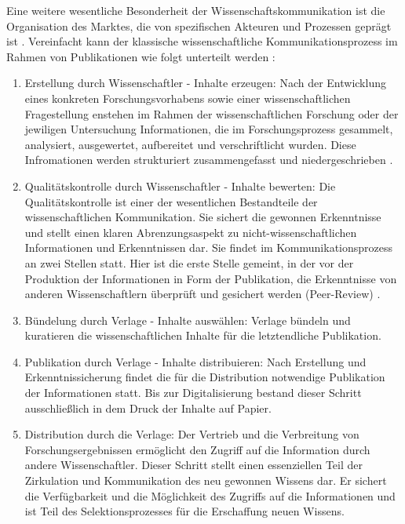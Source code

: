 Eine weitere wesentliche Besonderheit der Wissenschaftskommunikation ist die Organisation des Marktes, die von spezifischen Akteuren und Prozessen geprägt ist \cite{Hess_2006}. Vereinfacht kann der klassische wissenschaftliche Kommunikationsprozess im Rahmen von Publikationen wie folgt unterteilt werden\cite{cite:11b} \cite{Hess_2006}:
\begin{enumerate}
\item Erstellung durch Wissenschaftler - Inhalte erzeugen: 
Nach der Entwicklung eines konkreten Forschungsvorhabens sowie einer wissenschaftlichen Fragestellung enstehen im Rahmen der wissenschaftlichen Forschung oder der jewiligen Untersuchung Informationen\cite{cite:11c}, die im Forschungsprozess gesammelt, analysiert, ausgewertet, aufbereitet und verschriftlicht wurden\cite{cite:11d}. Diese Infromationen werden strukturiert zusammengefasst und niedergeschrieben \cite{Hess_2006}.
\item Qualitätskontrolle durch Wissenschaftler - Inhalte bewerten: 
Die Qualitätskontrolle ist einer der wesentlichen Bestandteile der wissenschaftlichen Kommunikation. Sie sichert die gewonnen Erkenntnisse\cite{cite:11e} und stellt einen klaren Abrenzungsaspekt zu nicht-wissenschaftlichen Informationen und Erkenntnissen dar\cite{cite:11f}. Sie findet im Kommunikationsprozess an zwei Stellen statt. Hier ist die erste Stelle gemeint, in der vor der Produktion der Informationen in Form der Publikation, die Erkenntnisse von anderen Wissenschaftlern überprüft und gesichert werden (Peer-Review) \cite{Hess_2006}.
\item Bündelung durch Verlage - Inhalte auswählen:
Verlage bündeln und kuratieren die wissenschaftlichen Inhalte für die letztendliche Publikation. 
\item Publikation durch Verlage - Inhalte distribuieren: 
Nach Erstellung und Erkenntnissicherung findet die für die Distribution notwendige Publikation der Informationen statt. Bis zur Digitalisierung bestand dieser Schritt ausschließlich in dem Druck der Inhalte auf Papier.\cite{cite:11h}
\item Distribution durch die Verlage: 
Der Vertrieb und die Verbreitung von Forschungsergebnissen ermöglicht den Zugriff auf die Information durch andere Wissenschaftler. Dieser Schritt stellt einen essenziellen Teil der Zirkulation und Kommunikation des neu gewonnen Wissens dar\cite{cite:11i}. Er sichert die Verfügbarkeit und die Möglichkeit des Zugriffs auf die Informationen und ist Teil des Selektionsprozesses für die Erschaffung neuen Wissens.\cite{cite:11l}

\end{enumerate}
